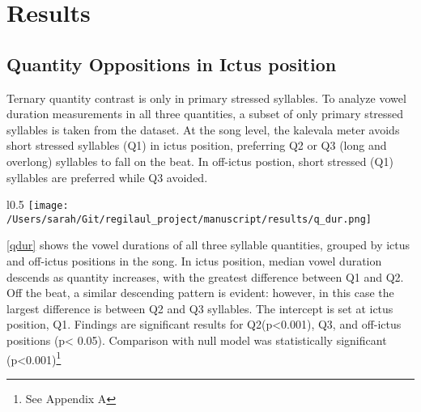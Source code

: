 \chapter{Results}
%

\section{Quantity Oppositions in Ictus position}


Ternary quantity contrast is only in primary stressed syllables. To analyze vowel duration measurements in all three quantities, a subset of only primary stressed syllables is taken from the dataset.
At the song level, the kalevala meter avoids short stressed syllables (Q1) in ictus position, preferring Q2 or Q3 (long and overlong) syllables to fall on the beat. In off-ictus postion, short stressed (Q1) syllables are preferred while Q3 avoided.


%
\begin{wrapfigure}{l}{0.5\textwidth}
\centering
\texttt{[image: /Users/sarah/Git/regilaul\_project/manuscript/results/q\_dur.png]}
\caption{density plot of vowel durations in three syllable quantities}
\label{qdur}

\end{wrapfigure}


\ref{qdur} shows the vowel durations of all three syllable quantities, grouped by ictus and off-ictus positions in the song. In ictus position, median vowel duration descends as quantity increases, with the greatest difference between Q1 and Q2. Off the beat, a similar descending pattern is evident: however, in this case the largest difference is between Q2 and Q3 syllables. 
 The intercept is set at ictus position, Q1. Findings are significant results for Q2(p<0.001), Q3, and off-ictus positions (p< 0.05). Comparison with null model was statistically significant (p<0.001)\footnote{See Appendix A} 
 
 




%
%
%
%
